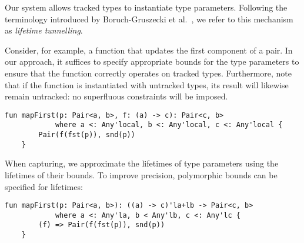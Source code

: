 \documentclass[acmsmall,review,screen]{acmart}
\begin{document}
Our system allows tracked types to instantiate type parameters.
Following the terminology introduced by Boruch-Gruszecki et al.~\cite{boruch2023capturing}, we refer to this mechanism as \emph{lifetime tunnelling}.

Consider, for example, a function that updates the first component of a pair.
In our approach, it suffices to specify appropriate bounds for the type parameters to ensure that the function correctly operates on tracked types.
Furthermore, note that if the function is instantiated with untracked types, its result will likewise remain untracked: no superfluous constraints will be imposed.
\begin{lstlisting}[language=colang]
    fun mapFirst(p: Pair<a, b>, f: (a) -> c): Pair<c, b>
            where a <: Any'local, b <: Any'local, c <: Any'local {
        Pair(f(fst(p)), snd(p))
    }
\end{lstlisting}

When capturing, we approximate the lifetimes of type parameters using the
lifetimes of their bounds.
To improve precision, polymorphic bounds can
be specified for lifetimes:
\begin{lstlisting}[language=colang]
    fun mapFirst(p: Pair<a, b>): ((a) -> c)'la+lb -> Pair<c, b>
            where a <: Any'la, b < Any'lb, c <: Any'lc {
        (f) => Pair(f(fst(p)), snd(p))
    }
\end{lstlisting}

%

%
%
\end{document}
